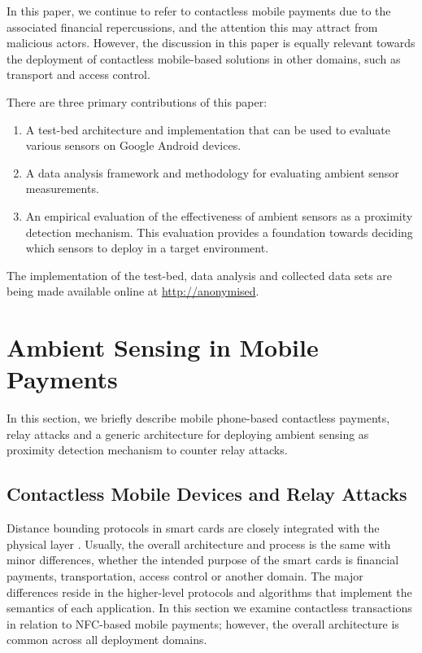 \documentclass{article}
\begin{document}
In this paper, we continue to refer to contactless mobile payments due to the associated financial repercussions, and the attention this may attract from malicious actors.  However, the discussion in this paper is equally relevant towards the deployment of contactless mobile-based solutions in other domains, such as transport and access control.

There are three primary contributions of this paper:
\begin{enumerate}
\item A test-bed architecture and implementation that can be used to evaluate various sensors on Google Android devices.
\item A data analysis framework and methodology for evaluating ambient sensor measurements.
\item An empirical evaluation of the effectiveness of ambient sensors as a proximity detection mechanism.  This evaluation provides a foundation towards deciding which sensors to deploy in a target environment.
\end{enumerate}

The implementation of the test-bed, data analysis and collected data sets are being made available online at \url{http://anonymised}.

\section{Ambient Sensing in Mobile Payments}
\label{sec:AmbientSensorDeploymetinMobilePayment}
In this section, we briefly describe mobile phone-based contactless payments, relay attacks and a generic architecture for deploying ambient sensing as proximity detection mechanism to counter relay attacks. 

\subsection{Contactless Mobile Devices and Relay Attacks}
\label{sub:ContactlessMobileHandsetsAndRelayAttacks}
Distance bounding protocols in smart cards are closely integrated with the physical layer \cite{Hancke:2005:RDB:1128018.1128472}.  Usually, the overall architecture and process is the same with minor differences, whether the intended purpose of the smart cards is financial payments, transportation, access control or another domain.  The major differences reside in the higher-level protocols and algorithms that implement the semantics of each application.  In this section we examine contactless transactions in relation to NFC-based mobile payments; however, the overall architecture is common across all deployment domains.  
\end{document}
